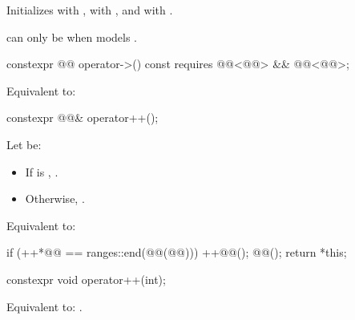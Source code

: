 \begin{itemdescr}
\pnum
\effects
Initializes  with ,
 with , and
 with .

\pnum
\begin{note}
 can only be 
when  models .
\end{note}
\end{itemdescr}

%
\begin{itemdecl}
constexpr @@ operator->() const
  requires @@<@@> && @@<@@>;
\end{itemdecl}

\begin{itemdescr}
\pnum
\effects
Equivalent to: 
\end{itemdescr}

%
\begin{itemdecl}
constexpr @@& operator++();
\end{itemdecl}

\begin{itemdescr}
\pnum
Let  be:
\begin{itemize}
\item If  is , .
\item Otherwise, .
\end{itemize}

\pnum
\effects
Equivalent to:
\begin{codeblock}
if (++*@@ == ranges::end(@@(@@))) {
  ++@@();
  @@();
}
return *this;
\end{codeblock}
\end{itemdescr}

%
\begin{itemdecl}
constexpr void operator++(int);
\end{itemdecl}

\begin{itemdescr}
\pnum
\effects
Equivalent to: .
\end{itemdescr}

